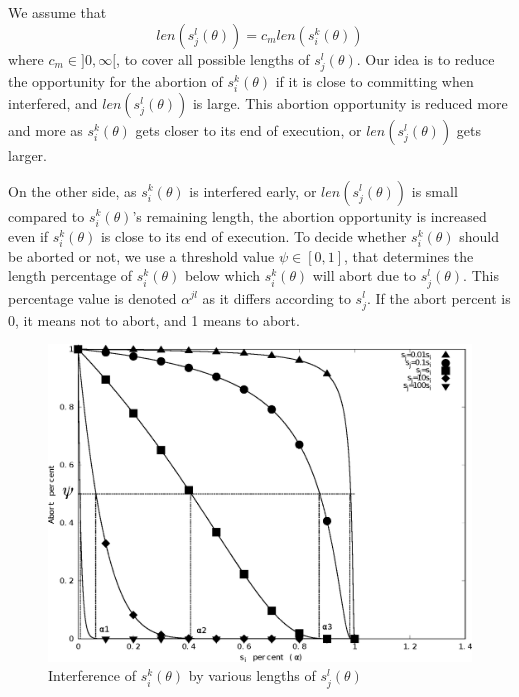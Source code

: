 \documentclass[conference]{IEEEtran}
\begin{document}
We assume that 
\begin{equation}
len(s_{j}^{l}(\theta))=c_{m}len(s_{i}^{k}(\theta))
\label{cm_eq}\end{equation}
where $c_{m}\in]0,\infty[$, to cover all possible lengths of $s_{j}^{l}(\theta)$.
Our idea is to reduce the opportunity for the abortion of $s_{i}^{k}(\theta)$ if it is close to committing when interfered, and $len(s_{j}^{l}(\theta))$ is large. This abortion opportunity is reduced more and more as $s_{i}^{k}(\theta)$ gets closer to its end of execution, or $len(s_{j}^{l}(\theta))$ gets larger. 

On the other side, as $s_{i}^{k}(\theta)$ is interfered early,
or $len(s_{j}^{l}(\theta))$ is small compared to $s_{i}^{k}(\theta)$'s remaining length, the abortion opportunity 
is increased even if $s_i^k (\theta)$ is close to its end of execution. To decide whether $s_{i}^{k}(\theta)$ should be 
aborted or not, we use a threshold value $\psi\in[0,1]$, that determines
the length percentage of $s_{i}^{k}(\theta)$ below which $s_{i}^{k}(\theta)$ will abort due to $s_{j}^{l}(\theta)$.
%
This percentage value is denoted $\alpha^{jl}$ as it differs according to $s_j^l$. 
%
If the abort percent is 0, it means not to abort, and 1 means to abort. 


%
\begin{figure}[htbp]
\centering
\includegraphics[scale=0.4]{figures/figure16}
\caption{\label{fig16}Interference of $s_{i}^{k}(\theta)$ by various lengths of 
$s_{j}^{l}(\theta)$}
\end{figure}
\end{document}
